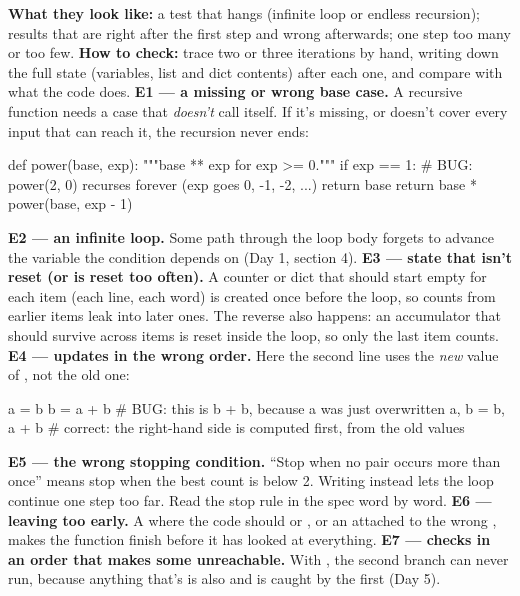 \documentclass[10pt,a4paper]{article}
\begin{document}
\textbf{What they look like:} a test that hangs (infinite loop or endless recursion); results that are right after the first step and wrong afterwards; one step too many or too few.
\textbf{How to check:} trace two or three iterations by hand, writing down the full state (variables, list and dict contents) after each one, and compare with what the code does.
\textbf{E1 — a missing or wrong base case.} A recursive function needs a case that \emph{doesn’t} call itself. If it’s missing, or doesn’t cover every input that can reach it, the recursion never ends:
\begin{pycode}
def power(base, exp):
    """base ** exp for exp >= 0."""
    if exp == 1:                   # BUG: power(2, 0) recurses forever (exp goes 0, -1, -2, ...)
        return base
    return base * power(base, exp - 1)
\end{pycode}
\textbf{E2 — an infinite  loop.} Some path through the loop body forgets to advance the variable the condition depends on (Day 1, section 4).
\textbf{E3 — state that isn’t reset (or is reset too often).} A counter or dict that should start empty for each item (each line, each word) is created once before the loop, so counts from earlier items leak into later ones. The reverse also happens: an accumulator that should survive across items is reset inside the loop, so only the last item counts.
\textbf{E4 — updates in the wrong order.} Here the second line uses the \emph{new} value of , not the old one:
\begin{pycode}
a = b
b = a + b              # BUG: this is b + b, because a was just overwritten
a, b = b, a + b        # correct: the right-hand side is computed first, from the old values
\end{pycode}
\textbf{E5 — the wrong stopping condition.} “Stop when no pair occurs more than once” means stop when the best count is below 2. Writing  instead lets the loop continue one step too far. Read the stop rule in the spec word by word.
\textbf{E6 — leaving too early.} A  where the code should  or , or an  attached to the wrong , makes the function finish before it has looked at everything.
\textbf{E7 — checks in an order that makes some unreachable.} With , the second branch can never run, because anything that’s  is also  and is caught by the first (Day 5).
\end{document}
